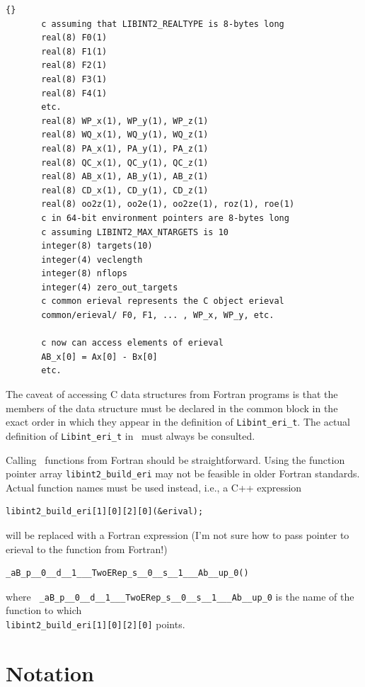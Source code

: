 \documentclass[10pt]{article}
\begin{document}
\begin{lstlisting}[label=lst:usefort,caption=Accesing {\tt Libint\_eri\_t}
structure from a Fortran code.]{}
       c assuming that LIBINT2_REALTYPE is 8-bytes long
       real(8) F0(1)
       real(8) F1(1)
       real(8) F2(1)
       real(8) F3(1)
       real(8) F4(1)
       etc.
       real(8) WP_x(1), WP_y(1), WP_z(1)
       real(8) WQ_x(1), WQ_y(1), WQ_z(1)
       real(8) PA_x(1), PA_y(1), PA_z(1)
       real(8) QC_x(1), QC_y(1), QC_z(1)
       real(8) AB_x(1), AB_y(1), AB_z(1)
       real(8) CD_x(1), CD_y(1), CD_z(1)
       real(8) oo2z(1), oo2e(1), oo2ze(1), roz(1), roe(1)
       c in 64-bit environment pointers are 8-bytes long
       c assuming LIBINT2_MAX_NTARGETS is 10
       integer(8) targets(10)
       integer(4) veclength
       integer(8) nflops
       integer(4) zero_out_targets
       c common erieval represents the C object erieval
       common/erieval/ F0, F1, ... , WP_x, WP_y, etc.

       c now can access elements of erieval
       AB_x[0] = Ax[0] - Bx[0]
       etc.
\end{lstlisting}

The caveat of accessing C data structures from Fortran programs is that the members of the data structure must be
declared in the common block in the exact order in which they appear in the definition of {\tt Libint\_eri\_t}.
The actual definition of {\tt Libint\_eri\_t} in \libinttypesh\ must always be consulted.

Calling \LIBINT\ functions from Fortran should be straightforward. Using the function pointer array {\tt libint2\_build\_eri} may
not be feasible in older Fortran standards. Actual function names must be used instead, i.e.,
a C++ expression
\begin{verbatim}
libint2_build_eri[1][0][2][0](&erival);
\end{verbatim}
will be replaced with a Fortran expression (I'm not sure how to pass pointer to erieval to the function from Fortran!)
\begin{verbatim}
_aB_p__0__d__1___TwoERep_s__0__s__1___Ab__up_0()
\end{verbatim}
where {\tt
\_aB\_p\_\_0\_\_d\_\_1\_\_\_TwoERep\_s\_\_0\_\_s\_\_1\_\_\_Ab\_\_up\_0} is the
name of the function to which \\
{\tt libint2\_build\_eri[1][0][2][0]} points.

\appendix
\appendixpage
\section{\label{sec:notation} Notation}
\end{document}
